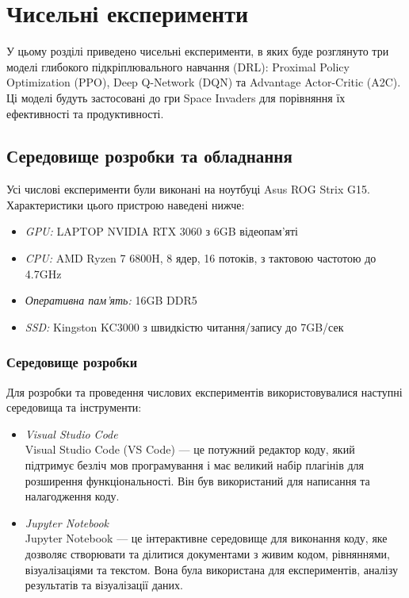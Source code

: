 

 \setcounter{chapter}{2}
 \chapter{Чисельні експерименти}
 У цьому розділі приведено чисельні експерименти, в яких буде розглянуто три моделі 
 глибокого підкріплювального навчання (DRL): Proximal Policy Optimization (PPO), 
 Deep Q-Network (DQN) та Advantage Actor-Critic (A2C). Ці моделі будуть застосовані 
 до гри Space Invaders для порівняння їх ефективності та продуктивності.
 
 \section{Середовище розробки та обладнання}
  \setcounter{equation}{0}
 \setcounter{theorem}{0}    

 Усі числові експерименти були виконані на ноутбуці Asus ROG Strix G15. Характеристики цього пристрою наведені нижче:
 
 \begin{itemize}
     \item \emph{GPU:} LAPTOP NVIDIA RTX 3060 з 6GB відеопам'яті
     \item \emph{CPU:} AMD Ryzen 7 6800H, 8 ядер, 16 потоків, з тактовою частотою до 4.7GHz
     \item \emph{Оперативна пам'ять:} 16GB DDR5
     \item \emph{SSD:} Kingston KC3000 з швидкістю читання/запису до 7GB/сек
 \end{itemize}
 
 \subsection{Середовище розробки}
 
 Для розробки та проведення числових експериментів використовувалися наступні середовища та інструменти:
 
 \begin{itemize}
     \item \emph{Visual Studio Code}\\
     Visual Studio Code (VS Code) — це потужний редактор коду, який підтримує безліч мов програмування і має великий набір плагінів для розширення функціональності. Він був використаний для написання та налагодження коду.
 
     \item \emph{Jupyter Notebook}\\
     Jupyter Notebook — це інтерактивне середовище для виконання коду, яке дозволяє створювати та ділитися документами з живим кодом, рівняннями, візуалізаціями та текстом. Вона була використана для експериментів, аналізу результатів та візуалізації даних.
 \end{itemize}
 
